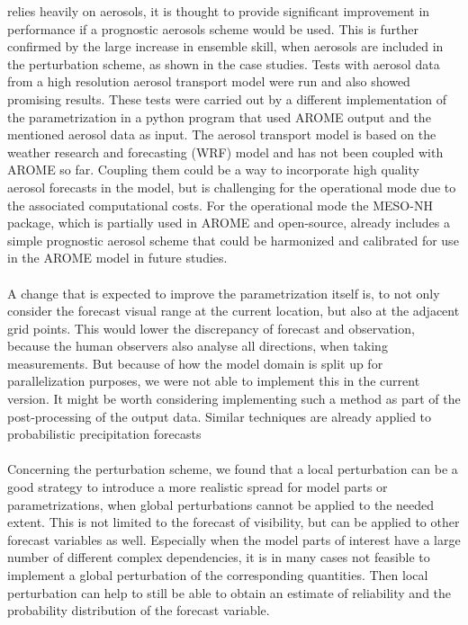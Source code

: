 relies heavily on aerosols, it is thought to provide significant improvement in performance if a prognostic aerosols scheme would be used. This is further confirmed by the large increase in ensemble skill, when aerosols are included in the perturbation scheme, as shown in the case studies. Tests with aerosol data from a high resolution aerosol transport model were run and also showed promising results. These tests were carried out by a different implementation of the parametrization in a python program that used AROME output and the mentioned aerosol data as input. The aerosol transport model is based on the weather research and forecasting (WRF) model and has not been coupled with AROME so far. Coupling them could be a way to incorporate high quality aerosol forecasts in the model, but is challenging for the operational mode due to the associated computational costs.
For the operational mode the MESO-NH package, which is partially used in AROME and open-source, already includes a simple prognostic aerosol scheme that could be harmonized and calibrated for use in the AROME model in future studies.  \\ \\
A change that is expected to improve the parametrization itself is, to not only consider the forecast visual range at the current location, but also at the adjacent grid points. This would lower the discrepancy of forecast and observation, because the human observers also analyse all directions, when taking measurements. But because of  how the model domain is split up for parallelization purposes, we were not able to implement this in the current version. It might be worth considering implementing such a method as  part of the post-processing of the output data. Similar techniques are already applied to probabilistic precipitation forecasts \cite{theis_hense_damrath_2005}\\ \\
Concerning the perturbation scheme, we found that a local perturbation can be a good strategy to introduce a more realistic spread for model parts or parametrizations, when global perturbations cannot be applied to the needed extent. This is not limited to the forecast of visibility, but can be applied to other forecast variables as well.
Especially when the model parts of interest have a large number of different complex dependencies, it is in many cases not feasible to implement a global perturbation of the corresponding quantities. Then local perturbation can help to still be able to obtain an estimate of reliability and the probability distribution of the forecast variable. \\
